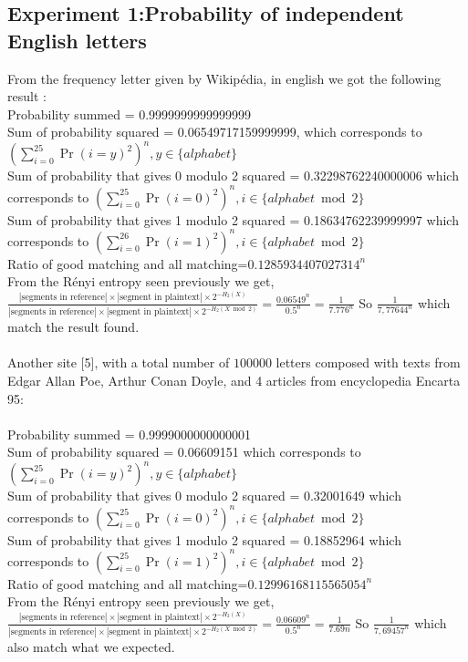\documentclass{article}
\begin{document}
\subsection*{Experiment 1:Probability of independent English letters}
From the frequency letter given by Wikip\'edia, in english we got the following result :\\
Probability summed = 0.9999999999999999
\\
Sum of probability squared = 0.06549717159999999, which corresponds to $(\sum_{i=0}^{25}{\Pr(i=y)^2})^n, y \in \{alphabet\} $\\
Sum of probability that gives 0 modulo 2 squared  = 0.32298762240000006 which corresponds to $(\sum_{i=0}^{25}{\Pr(i=0)^2})^n, i \in \{alphabet \bmod 2\} $\\
Sum of probability that gives 1 modulo 2 squared = 0.18634762239999997 which corresponds to $(\sum_{i=0}^{26}{\Pr(i=1)^2})^n, i \in \{alphabet \bmod 2\} $\\
Ratio of good matching and all matching=$0.1285934407027314^n$\\
From the R\'enyi entropy seen previously we get, $\frac{|\text{segments in reference}| \times |\text{segment in plaintext}| \times 2^{-H_{2}(X)}}{|\text{segments in reference}| \times |\text{segment in plaintext}| \times 2^{-H_{2}(X \bmod 2)}}  = \frac{0.06549^n}{0.5^n} = \frac{1}{7.776^n}$
So $\frac{1}{7,77644^n}$ which match the result found.
\\
\\
Another site [5], with a total number of $100000$ letters composed with texts from Edgar Allan Poe, Arthur Conan Doyle, and 4 articles from encyclopedia Encarta 95:\\
\\
Probability summed = 0.9999000000000001\\
Sum of probability squared = 0.06609151 which corresponds to $(\sum_{i=0}^{25}{\Pr(i=y)^2})^n, y \in \{alphabet\} $\\
Sum of probability that gives 0 modulo 2 squared = 0.32001649 which corresponds to $(\sum_{i=0}^{25}{\Pr(i=0)^2})^n, i \in \{alphabet \bmod 2\} $\\
Sum of probability that gives 1 modulo 2 squared = 0.18852964 which corresponds to $(\sum_{i=0}^{25}{\Pr(i=1)^2})^n, i \in \{alphabet \bmod 2\} $\\
Ratio of good matching and all matching=$0.12996168115565054^n$\\
From the R\'enyi entropy seen previously we get, $\frac{|\text{segments in reference}| \times |\text{segment in plaintext}| \times 2^{-H_{2}(X)}}{|\text{segments in reference}| \times |\text{segment in plaintext}| \times 2^{-H_{2}(X \bmod 2)}}  = \frac{0.06609^n}{0.5^n} = \frac{1}{7.69n}$
So $\frac{1}{7,69457^n}$ which also match what we expected.
\end{document}

